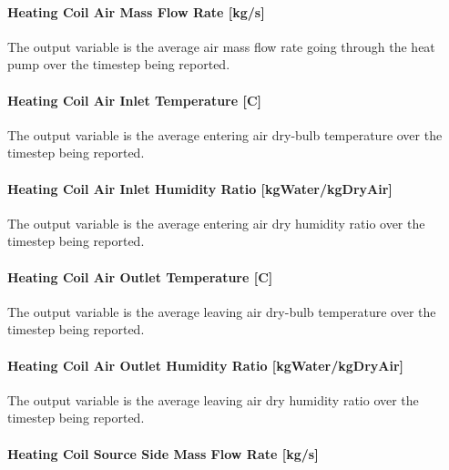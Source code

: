 \paragraph{Heating Coil Air Mass Flow Rate {[}kg/s{]}}\label{heating-coil-air-mass-flow-rate-kgs-2}

The output variable is the average air mass flow rate going through the heat pump over the timestep being reported.

\paragraph{Heating Coil Air Inlet Temperature {[}C{]}}\label{heating-coil-air-inlet-temperature-c-2}

The output variable is the average entering air dry-bulb temperature over the timestep being reported.

\paragraph{Heating Coil Air Inlet Humidity Ratio {[}kgWater/kgDryAir{]}}\label{heating-coil-air-inlet-humidity-ratio-kgwaterkgdryair-2}

The output variable is the average entering air dry humidity ratio over the timestep being reported.

\paragraph{Heating Coil Air Outlet Temperature {[}C{]}}\label{heating-coil-air-outlet-temperature-c-2}

The output variable is the average leaving air dry-bulb temperature over the timestep being reported.

\paragraph{Heating Coil Air Outlet Humidity Ratio {[}kgWater/kgDryAir{]}}\label{heating-coil-air-outlet-humidity-ratio-kgwaterkgdryair-2}

The output variable is the average leaving air dry humidity ratio over the timestep being reported.

\paragraph{Heating Coil Source Side Mass Flow Rate {[}kg/s{]}}\label{heating-coil-source-side-mass-flow-rate-kgs-1}

